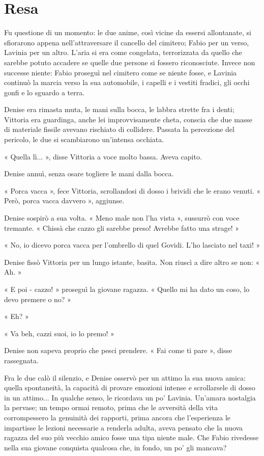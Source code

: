 \chapter{Resa}

Fu questione di un momento: le due anime, così vicine da essersi allontanate, si sfiorarono appena nell'attraversare il cancello del cimitero; Fabio per un verso, Lavinia per un altro. L'aria si era come congelata, terrorizzata da quello che sarebbe potuto accadere se quelle due persone si fossero riconosciute. Invece non successe niente: Fabio proseguì nel cimitero come se niente fosse, e Lavinia continuò la marcia verso la sua automobile, i capelli e i vestiti fradici, gli occhi gonfi e lo sguardo a terra.

Denise era rimasta muta, le mani sulla bocca, le labbra strette fra i denti; Vittoria era guardinga, anche lei improvvisamente cheta, conscia che due masse di materiale fissile avevano rischiato di collidere. Passata la percezione del pericolo, le due si scambiarono un'intensa occhiata.

« Quella lì... », disse Vittoria a voce molto bassa. Aveva capito.

Denise annuì, senza osare togliere le mani dalla bocca.

« Porca vacca », fece Vittoria, scrollandosi di dosso i brividi che le erano venuti. « Però, porca vacca davvero », aggiunse.

Denise sospirò a sua volta. « Meno male non l'ha vista », sussurrò con voce tremante. « Chissà che cazzo gli sarebbe preso! Avrebbe fatto una strage! »

« No, io dicevo porca vacca per l'ombrello di quel Govidi. L'ho lasciato nel taxi! »

Denise fissò Vittoria per un lungo istante, basita. Non riuscì a dire altro se non: « Ah. »

« E poi - cazzo! » proseguì la giovane ragazza. « Quello mi ha dato un coso, lo devo premere o no? »

« Eh? »

« Va beh, cazzi suoi, io lo premo! »

Denise non sapeva proprio che pesci prendere. « Fai come ti pare », disse rassegnata.

Fra le due calò il silenzio, e Denise osservò per un attimo la sua nuova amica: quella spontaneità, la capacità di provare emozioni intense e scrollarsele di dosso in un attimo... In qualche senso, le ricordava un po' Lavinia. Un'amara nostalgia la pervase; un tempo ormai remoto, prima che le avversità della vita corrompessero la genuinità dei rapporti, prima ancora che l'esperienza le impartisse le lezioni necessarie a renderla adulta, aveva pensato che la nuova ragazza del suo più vecchio amico fosse una tipa niente male. Che Fabio rivedesse nella sua giovane conquista qualcosa che, in fondo, un po' gli mancava?

